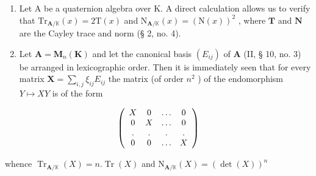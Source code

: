 \begin{enumerate}
\def\labelenumi{(\arabic{enumi})}
\setcounter{enumi}{1}
\item
  Let A be a quaternion algebra over K. A direct calculation allows us to verify that \(\mathrm{Tr}_{\mathbf{A} / \mathbb{K}}(x) = 2\mathrm{T}(x)\) and \(\mathrm{N}_{\mathbf{A} / \mathbb{K}}(x) = (\mathrm{N}(x))^2\) , where \(\mathbf{T}\) and \(\mathbf{N}\) are the Cayley trace and norm (§ 2, no. 4).
\item
  Let \(\mathbf{A} = \mathbf{M}_n(\mathbf{K})\) and let the canonical basis \((E_{ij})\) of \(\mathbf{A}\) (II, § 10, no. 3) be arranged in lexicographic order. Then it is immediately seen that for every matrix \(\mathbf{X} = \sum_{i,j} \xi_{ij} E_{ij}\) the matrix (of order \(n^2\) ) of the endomorphism \(Y \mapsto XY\) is of the form
\end{enumerate}

\[
\left( \begin{array}{c c c c} X & 0 & \ldots & 0 \\ 0 & X & \ldots & 0 \\ . & . & . & . \\ 0 & 0 & \ldots & X \end{array} \right)
\]

whence \(\operatorname{Tr}_{\mathbf{A} / \mathbb{K}}(X) = n.\operatorname{Tr}(X)\) and \(\mathrm{N}_{\mathbf{A} / \mathbb{K}}(X) = (\det (X))^n\)

